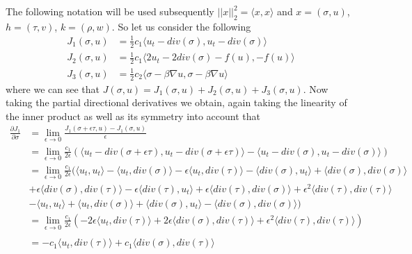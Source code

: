 \documentclass[../draft_1.tex]{subfiles}
\begin{document}
The following notation will be used subsequently $ || x ||_2^2 = \langle x , x \rangle$ and $ x = (\sigma, u)$, $h = (\tau, v)$, $k = (\rho, w)$. So let us consider the following 
\begin{equation}
\begin{aligned}
J_1(\sigma, u) &= \frac{1}{2}c_1\langle u_t - div(\sigma), u_t - div(\sigma) \rangle \\
J_2(\sigma, u) &= \frac{1}{2} c_1 \langle 2 u_t - 2 div(\sigma) - f(u), - f(u) \rangle \\
J_3(\sigma, u) &= \frac{1}{2} c_2\langle \sigma - \beta \nabla u, \sigma  - \beta \nabla u \rangle
\end{aligned}
\end{equation}
where we can see that $J(\sigma, u) = J_1(\sigma, u) + J_2(\sigma, u) + J_3(\sigma, u)$. Now taking the partial directional derivatives we obtain, again taking the linearity of the inner product as well as its symmetry into account that
\begin{equation}
\begin{aligned}
\frac{\partial J_1}{\partial \sigma} &= \lim_{\epsilon \rightarrow 0} \frac{J_1(\sigma + \epsilon \tau, u) - J_1(\sigma, u)}{\epsilon}  \\ 
&= \lim_{\epsilon \rightarrow 0} \frac{c_1}{2 \epsilon} (\langle u_t - div(\sigma + \epsilon \tau), u_t - div(\sigma + \epsilon \tau) \rangle - \langle u_t - div(\sigma), u_t - div(\sigma) \rangle) \\
&=  \lim_{\epsilon \rightarrow 0} \frac{c_1}{2 \epsilon} (\langle u_t, u_t \rangle - \langle u_t, div(\sigma) \rangle - \epsilon \langle u_t, div(\tau) \rangle - \langle div(\sigma), u_t \rangle + \langle div(\sigma), div(\sigma) \rangle \\ &+ \epsilon \langle div(\sigma), div(\tau) \rangle - \epsilon \langle div(\tau), u_t \rangle + \epsilon \langle div(\tau), div(\sigma) \rangle + \epsilon^2 \langle div(\tau), div(\tau) \rangle \\
& - \langle u_t, u_t \rangle + \langle u_t, div(\sigma) \rangle + \langle div(\sigma), u_t \rangle - \langle div(\sigma), div(\sigma) \rangle) \\
&= \lim_{\epsilon \rightarrow 0} \frac{c_1}{2 \epsilon} (- 2 \epsilon \langle u_t, div(\tau) \rangle + 2 \epsilon \langle div(\sigma), div(\tau) \rangle + \epsilon^2 \langle div(\tau), div(\tau) \rangle )
\\
\\
&= - c_1 \langle u_t, div(\tau) \rangle + c_1 \langle div(\sigma), div(\tau) \rangle
\end{aligned}
\end{equation}
\end{document}
